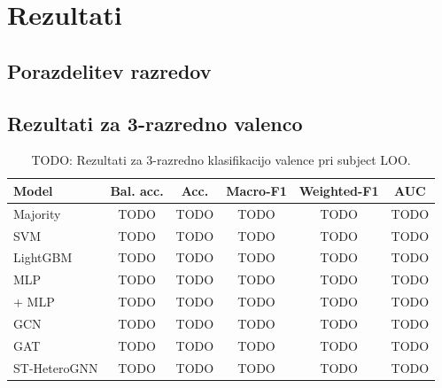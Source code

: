 \chapter{Rezultati}
\label{sec:rezultati}


\section{Porazdelitev razredov}
\label{subsec:rezultati-class-balance}


\section{Rezultati za 3-razredno valenco}
\label{subsec:rezultati-valence}

\begin{table}[H]
    \centering
    \caption{TODO: Rezultati za 3-razredno klasifikacijo valence pri subject LOO.}
    \label{tab:results-valence-subject-loo}
    \begin{tabular}{lccccc}
        \toprule
        Model & Bal. acc. & Acc. & Macro-F1 & Weighted-F1 & AUC \\
        \midrule
        Majority & TODO & TODO & TODO & TODO & TODO \\
        SVM & TODO & TODO & TODO & TODO & TODO \\
        LightGBM & TODO & TODO & TODO & TODO & TODO \\
        MLP & TODO & TODO & TODO & TODO & TODO \\
        \GazeMAE{} + MLP & TODO & TODO & TODO & TODO & TODO \\
        GCN & TODO & TODO & TODO & TODO & TODO \\
        GAT & TODO & TODO & TODO & TODO & TODO \\
        ST-HeteroGNN & TODO & TODO & TODO & TODO & TODO \\
        \bottomrule
    \end{tabular}
\end{table}

